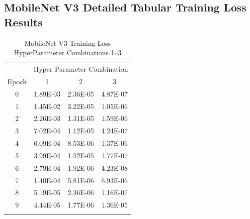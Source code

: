 \documentclass[10pt, conference]{IEEEtran}
\begin{document}


\subsection{MobileNet V3 Detailed Tabular Training Loss Results} %

\begin{table}[H]
    \centering
    \begin{tabular}{@{}cccc@{}}
        \toprule
        & \multicolumn{3}{c}{Hyper Parameter Combination} \\
        \cmidrule{2-4}
            Epoch  & 1 & 2 & 3\\
        \midrule

        0 & 1.89E-03 & 2.36E-05 & 4.87E-07 \\
        1 & 1.45E-02 & 3.22E-05 & 1.05E-06 \\
        2 & 2.26E-03 & 1.31E-05 & 1.59E-06 \\
        3 & 7.02E-04 & 1.12E-05 & 4.24E-07 \\
        4 & 6.09E-04 & 8.53E-06 & 1.37E-06 \\
        5 & 3.99E-04 & 1.52E-05 & 1.77E-07 \\
        6 & 2.79E-04 & 1.92E-06 & 4.23E-08 \\
        7 & 1.40E-04 & 5.81E-06 & 6.93E-06 \\
        8 & 5.19E-05 & 2.36E-06 & 1.16E-07 \\
        9 & 4.44E-05 & 1.77E-06 & 1.36E-05 \\

        \bottomrule\smallskip
    \end{tabular}
    \caption{MobileNet V3 Training Loss HyperParameter Combinations 1--3}%
    \label{table:MobileNetV3TrainingLoss1-3}
\end{table}
\end{document}
